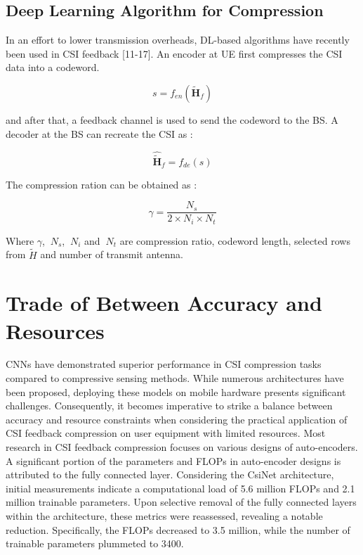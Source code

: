 \documentclass[lettersize,journal]{IEEEtran}
\begin{document}
\subsection{Deep Learning Algorithm for Compression}\label{AA}

In an effort to lower transmission overheads, DL-based algorithms have recently been used in CSI feedback [11-17]. An encoder at UE first compresses the CSI data into a codeword.

\begin{equation}
 s=f_{en}(\tilde{\textbf{H}}_{f}) 
\end{equation}

and after that, a feedback channel is used to send the codeword to the BS. A decoder at the BS can recreate the CSI as :

\begin{equation}
\hat{{\tilde{\textbf{H}}}}_{f}=f_{de}(s) 
\end{equation}

The compression ration can be obtained as : 

\begin{equation}
\gamma=\frac{N_{s}}{2\times N_{i}\times N_{t}}  
\end{equation}

Where \begin{math}\gamma \end{math}, \begin{math}\ N_{s} \end{math}, \begin{math}\ N_{i} \end{math} and \begin{math}\ N_{t} \end{math} are compression ratio, codeword length, selected rows from \begin{math}\tilde{H} \end{math} and number of transmit antenna.



\section{Trade of Between Accuracy and Resources} 
CNNs have demonstrated superior performance in CSI compression tasks compared to compressive sensing methods. While numerous architectures have been proposed, deploying these models on mobile hardware presents significant challenges. Consequently, it becomes imperative to strike a balance between accuracy and resource constraints when considering the practical application of CSI feedback compression on user equipment with limited resources.
Most research in CSI feedback compression focuses on various designs of auto-encoders. A significant portion of the parameters and FLOPs in auto-encoder designs is attributed to the fully connected layer. Considering the CsiNet \cite{abe} architecture, initial measurements indicate a computational load of 5.6 million FLOPs and 2.1 million trainable parameters. Upon selective removal of the fully connected layers within the architecture, these metrics were reassessed, revealing a notable reduction. Specifically, the FLOPs decreased to 3.5 million, while the number of trainable parameters plummeted to 3400.
\end{document}
